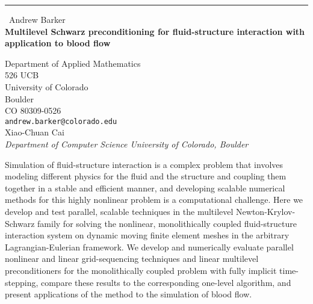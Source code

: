 \documentclass{report}
\begin{document}
\begin{center}
\rule{6in}{1pt} \
{\large Andrew Barker \\
{\bf Multilevel Schwarz preconditioning for fluid-structure interaction with application to blood flow}}

Department of Applied Mathematics \\ 526 UCB \\ University of Colorado \\ Boulder \\ CO 80309-0526
\\
{\tt andrew.barker@colorado.edu}\\
Xiao-Chuan Cai\\
{\em Department of Computer Science
University of Colorado, Boulder}\end{center}

Simulation of fluid-structure interaction is a complex problem that
involves modeling different physics for the fluid and the structure and
coupling them together in a stable and efficient manner, and developing
scalable numerical methods for this highly nonlinear problem is a
computational challenge. Here we develop and test parallel, scalable
techniques in the multilevel Newton-Krylov-Schwarz family for solving the
nonlinear, monolithically coupled fluid-structure interaction system on
dynamic moving finite element meshes in the arbitrary Lagrangian-Eulerian
framework. We develop and numerically evaluate parallel nonlinear and
linear grid-sequencing techniques and linear multilevel preconditioners
for the monolithically coupled problem with fully implicit time-stepping,
compare these results to the corresponding one-level algorithm, and
present applications of the method to the simulation of blood flow.
\end{document}
